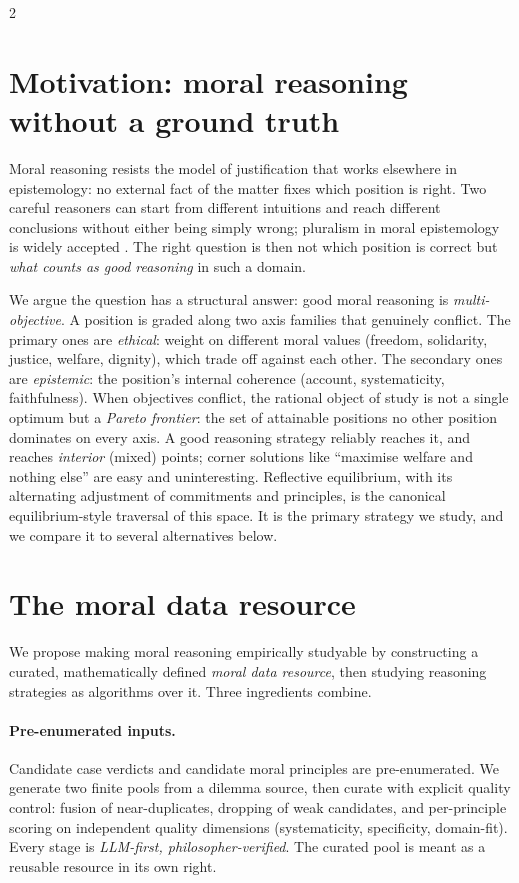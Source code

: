 \documentclass[10pt]{article}
\begin{document}
\begin{multicols}{2}

\section{Motivation: moral reasoning without a ground truth}

Moral reasoning resists the model of justification that works elsewhere in
epistemology: no external fact of the matter fixes which position is right.
Two careful reasoners can start from different intuitions and reach different
conclusions without either being simply wrong; pluralism in moral epistemology
is widely accepted \citep{elgin1996, rechnitzer2022}. The right question is
then not which position is correct but \emph{what counts as good reasoning} in
such a domain.

We argue the question has a structural answer: good moral reasoning is
\emph{multi-objective}. A position is graded along two axis families that
genuinely conflict. The primary ones are \emph{ethical}: weight on different
moral values (freedom, solidarity, justice, welfare, dignity), which trade off
against each other. The secondary ones are \emph{epistemic}: the position's
internal coherence (account, systematicity, faithfulness).
When objectives conflict, the rational object of study is not a single optimum
but a \emph{Pareto frontier}: the set of attainable positions no other position
dominates on every axis. A good reasoning strategy reliably reaches it, and
reaches \emph{interior} (mixed) points; corner solutions like ``maximise
welfare and nothing else'' are easy and uninteresting. Reflective equilibrium,
with its alternating adjustment of commitments and principles, is the
canonical equilibrium-style traversal of this space. It is the primary
strategy we study, and we compare it to several alternatives below.

\section{The moral data resource}\label{sec:resource}

We propose making moral reasoning empirically studyable by constructing a
curated, mathematically defined \emph{moral data resource}, then studying
reasoning strategies as algorithms over it. Three ingredients combine.

\paragraph{Pre-enumerated inputs.} Candidate case verdicts and candidate
moral principles are pre-enumerated. We generate two finite pools from a
dilemma source, then curate with explicit quality control: fusion of
near-duplicates, dropping of weak candidates, and per-principle scoring on
independent quality dimensions (systematicity, specificity, domain-fit).
Every stage is \emph{LLM-first, philosopher-verified}. The curated pool is
meant as a reusable resource in its own right.


\end{multicols}
\end{document}
